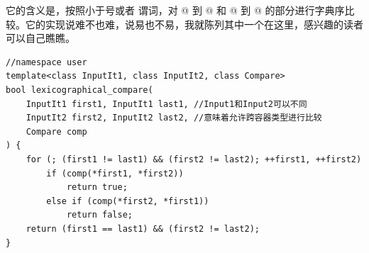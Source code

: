 它的含义是，按照小于号或者 \lstinline@comp@ 谓词，对 @ 到 @ 和 @ 到 @ 的部分进行字典序比较。它的实现说难不也难，说易也不易，我就陈列其中一个在这里，感兴趣的读者可以自己瞧瞧。
\begin{lstlisting}
//namespace user
template<class InputIt1, class InputIt2, class Compare>
bool lexicographical_compare(
    InputIt1 first1, InputIt1 last1, //Input1和Input2可以不同
    InputIt2 first2, InputIt2 last2, //意味着允许跨容器类型进行比较
    Compare comp
) {
    for (; (first1 != last1) && (first2 != last2); ++first1, ++first2)
        if (comp(*first1, *first2))
            return true;
        else if (comp(*first2, *first1))
            return false;
    return (first1 == last1) && (first2 != last2);
}
\end{lstlisting}\par
